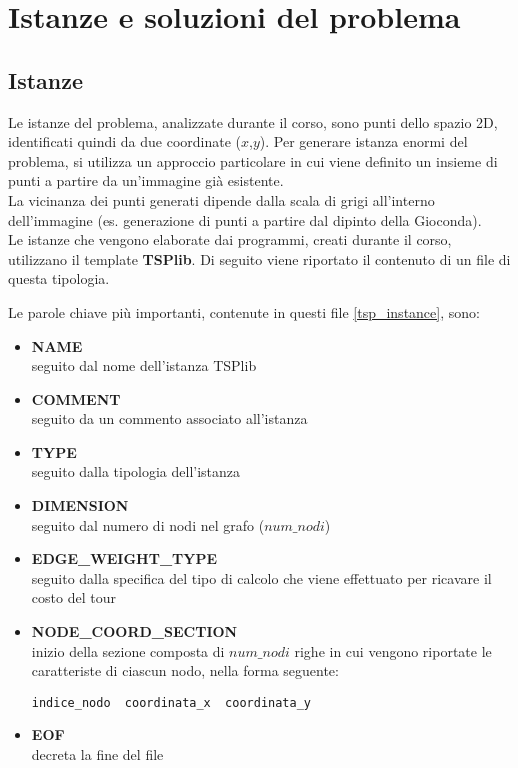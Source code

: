 \chapter{Istanze e soluzioni del problema}
\section{Istanze}
Le istanze del problema, analizzate durante il corso, sono punti dello spazio 2D, identificati quindi da due coordinate ($x$,$y$).
Per generare istanza enormi del problema, si utilizza un approccio particolare in cui viene definito un insieme di punti a partire da un'immagine già esistente.\\
La vicinanza dei punti generati dipende dalla scala di grigi all'interno dell'immagine (es. generazione di punti a partire dal dipinto della Gioconda\cite{monnalisa}).\\
Le istanze che vengono elaborate dai programmi, creati durante il corso, utilizzano il template \textbf{TSPlib}. Di seguito viene riportato il contenuto di un file di questa tipologia.
 


Le parole chiave più importanti, contenute in questi file \ref{tsp_instance}, sono:
\begin{itemize}
\item{\textbf{NAME}\\
seguito dal nome dell'istanza TSPlib}
\item{\textbf{COMMENT}\\
seguito da un commento associato all'istanza}
\item{\textbf{TYPE}\\
seguito dalla tipologia dell'istanza}
\item{\textbf{DIMENSION}\\
seguito dal numero di nodi nel grafo ($num\_nodi$)}
\item{\textbf{EDGE\_WEIGHT\_TYPE}\\
seguito dalla specifica del tipo di calcolo che viene effettuato per ricavare il costo del tour}
\item{\textbf{NODE\_COORD\_SECTION}\\
inizio della sezione composta di $num\_nodi$ righe in cui vengono riportate le caratteriste di ciascun nodo, nella forma seguente:
\begin{lstlisting}[linewidth=250pt,basicstyle=\footnotesize\sffamily,]     
indice_nodo  coordinata_x  coordinata_y
\end{lstlisting}}
\item{\textbf{EOF}\\
decreta la fine del file}
\end{itemize}

